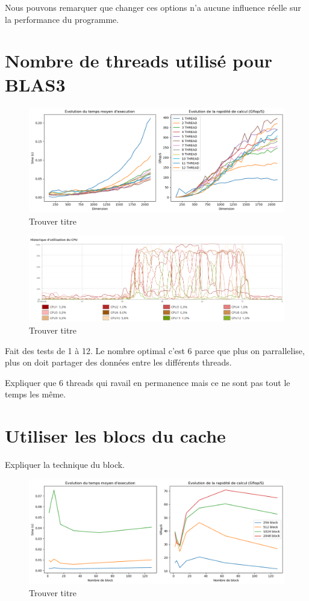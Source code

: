 \documentclass{report}
\begin{document}
Nous pouvons remarquer que changer ces options n'a aucune influence réelle sur la performance du programme.

\chapter{Nombre de threads utilisé pour BLAS3}
\begin{figure}[H]
    \centering
    \includegraphics[width=0.7\linewidth]{images/fig6.png}
    \caption{Trouver titre}
    \label{fig:6}
\end{figure}

\begin{figure}[H]
    \centering
    \includegraphics[width=0.7\linewidth]{images/useCPU.png}
    \caption{Trouver titre}
    \label{fig:7}
\end{figure}

Fait des tests de 1 à 12. Le nombre optimal c'est 6 parce que plus on parrallelise, plus on doit partager des données entre les différents threads. 

Expliquer que 6 threads qui ravail en permanence mais ce ne sont pas tout le temps les même.

\chapter{Utiliser les blocs du cache}

Expliquer la technique du block.

\begin{figure}[H]
    \centering
    \includegraphics[width=0.7\linewidth]{images/fig7.png}
    \caption{Trouver titre}
    \label{fig:8}
\end{figure}
\end{document}
